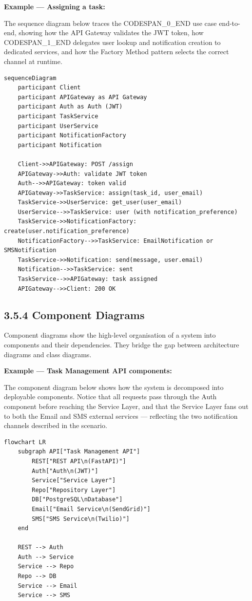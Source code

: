 \documentclass[11pt,a4paper]{book}
\begin{document}
\textbf{Example --- Assigning a task:}

The sequence diagram below traces the CODESPAN\_0\_END use case end-to-end, showing how the API Gateway validates the JWT token, how CODESPAN\_1\_END delegates user lookup and notification creation to dedicated services, and how the Factory Method pattern selects the correct channel at runtime.

\begin{lstlisting}
sequenceDiagram
    participant Client
    participant APIGateway as API Gateway
    participant Auth as Auth (JWT)
    participant TaskService
    participant UserService
    participant NotificationFactory
    participant Notification

    Client->>APIGateway: POST /assign
    APIGateway->>Auth: validate JWT token
    Auth-->>APIGateway: token valid
    APIGateway->>TaskService: assign(task_id, user_email)
    TaskService->>UserService: get_user(user_email)
    UserService-->>TaskService: user (with notification_preference)
    TaskService->>NotificationFactory: create(user.notification_preference)
    NotificationFactory-->>TaskService: EmailNotification or SMSNotification
    TaskService->>Notification: send(message, user.email)
    Notification-->>TaskService: sent
    TaskService-->>APIGateway: task assigned
    APIGateway-->>Client: 200 OK
\end{lstlisting}

\subsection{3.5.4 Component Diagrams}

Component diagrams show the high-level organisation of a system into components and their dependencies. They bridge the gap between architecture diagrams and class diagrams.

\textbf{Example --- Task Management API components:}

The component diagram below shows how the system is decomposed into deployable components. Notice that all requests pass through the Auth component before reaching the Service Layer, and that the Service Layer fans out to both the Email and SMS external services --- reflecting the two notification channels described in the scenario.

\begin{lstlisting}
flowchart LR
    subgraph API["Task Management API"]
        REST["REST API\n(FastAPI)"]
        Auth["Auth\n(JWT)"]
        Service["Service Layer"]
        Repo["Repository Layer"]
        DB["PostgreSQL\nDatabase"]
        Email["Email Service\n(SendGrid)"]
        SMS["SMS Service\n(Twilio)"]
    end

    REST --> Auth
    Auth --> Service
    Service --> Repo
    Repo --> DB
    Service --> Email
    Service --> SMS
\end{lstlisting}
\end{document}
